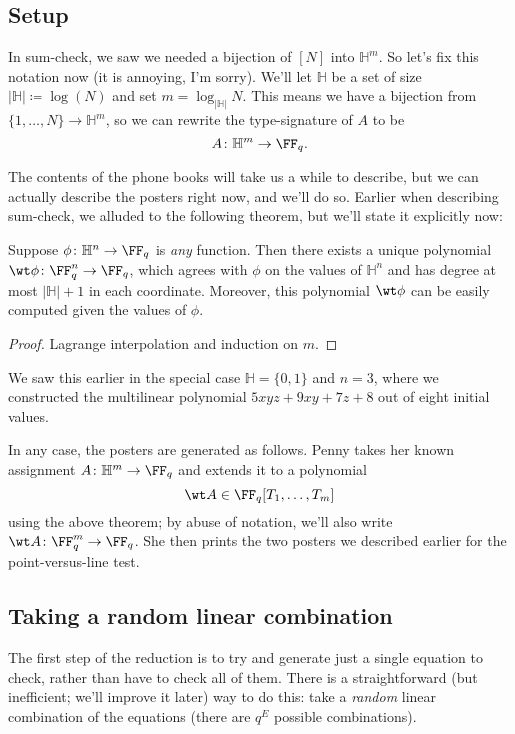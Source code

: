 \documentclass[11pt]{scrreprt}
\newcommand{\HH}{\mathbb H}
\begin{document}
\subsection{Setup}
In sum-check, we saw we needed a bijection of $[N]$ into $\HH^m$.
So let's fix this notation now (it is annoying, I'm sorry).
We'll let $\HH$ be a set of size $|\HH| \coloneqq \log (N)$
and set $m = \log_{|\HH|} N$.
This means we have a bijection from $\{1, \dots, N\} \to \HH^m$,
so we can rewrite the type-signature of $A$ to be
\[ A \colon \HH^m \to \FF_q. \]

The contents of the phone books will take us a while to describe,
but we can actually describe the posters right now, and we'll do so.
Earlier when describing sum-check, we alluded to the following theorem,
but we'll state it explicitly now:
\begin{theorem}
  Suppose $\phi \colon \HH^n \to \FF_q$ is \emph{any} function.
  Then there exists a unique polynomial $\wt\phi \colon \FF_q^n \to \FF_q$,
  which agrees with $\phi$ on the values of $\HH^n$
  and has degree at most $|\HH|+1$ in each coordinate.
  Moreover, this polynomial $\wt\phi$ can be easily computed given the values of $\phi$.
\end{theorem}
\begin{proof}
  Lagrange interpolation and induction on $m$.
\end{proof}
We saw this earlier in the special case $\HH=\{0,1\}$ and $n=3$,
where we constructed the multilinear polynomial $5xyz+9xy+7z+8$ out of
eight initial values.

In any case, the posters are generated as follows.
Penny takes her known assignment $A \colon \HH^m \to \FF_q$
and extends it to a polynomial
\[ \wt A \in \FF_q[T_1, \dots, T_m] \]
using the above theorem;
by abuse of notation, we'll also write $\wt A \colon \FF_q^m \to \FF_q$.
She then prints the two posters we described earlier for the point-versus-line test.

\subsection{Taking a random linear combination}
The first step of the reduction is to try and generate just a single equation to check,
rather than have to check all of them.
There is a straightforward (but inefficient; we'll improve it later) way to do this:
take a \emph{random} linear combination of the equations
(there are $q^E$ possible combinations).
\end{document}
